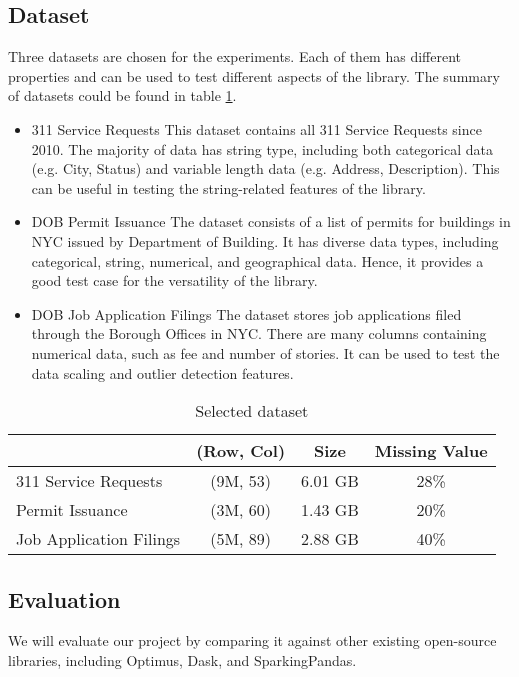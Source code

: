 \documentclass[sigconf]{acmart}
\begin{document}
\subsection{Dataset}
Three datasets are chosen for the experiments. Each of them has different properties and can be used to test different aspects of the library. The summary of datasets could be found in table \ref{tab:dataset}.
\begin{itemize}
	\item{311 Service Requests}\cite{nycopendata1} This dataset contains all 311 Service Requests since 2010. The majority of data has string type, including both categorical  data (e.g. City, Status) and variable length data (e.g. Address, Description). This can be useful in testing the string-related features of the library.
	\item{DOB Permit Issuance}\cite{nycopendata2} The dataset consists of a list of permits for buildings in NYC issued by Department of Building. It has diverse data types, including categorical, string, numerical, and geographical data. Hence, it provides a good test case for the versatility of the library. 
	\item{DOB Job Application Filings}\cite{nycopendata3} The dataset stores job applications filed through the Borough Offices in NYC. There are many columns containing numerical data, such as fee and number of stories. It can be used to test the data scaling and outlier detection features. 
\end{itemize}

\begin{table}
\caption{Selected dataset}   
\label{tab:dataset}
\begin{tabular}{lccc}   
 		                 & (Row, Col)  & Size      & Missing Value  \\  
\hline
 311 Service Requests   & (9M, 53)     & 6.01 GB  & 28\%            \\ 
 Permit Issuance            & (3M, 60)     & 1.43 GB  & 20\%             \\  
 Job Application Filings   & (5M, 89)     & 2.88 GB  & 40\%             \\ 


\end{tabular}   
\end{table}

\subsection{Evaluation}
We will evaluate our project by comparing it against other existing open-source libraries, including Optimus\cite{optimus}, Dask\cite{dask}, and SparkingPandas\cite{sparklingpandas}. 
\end{document}
